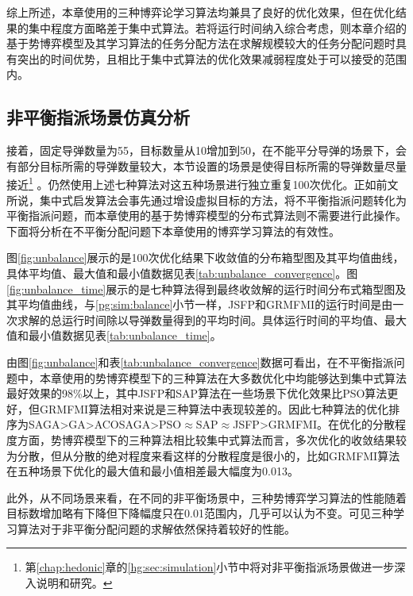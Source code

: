 综上所述，本章使用的三种博弈论学习算法均兼具了良好的优化效果，但在优化结果的集中程度方面略差于集中式算法。若将运行时间纳入综合考虑，则本章介绍的基于势博弈模型及其学习算法的任务分配方法在求解规模较大的任务分配问题时具有突出的时间优势，且相比于集中式算法的优化效果减弱程度处于可以接受的范围内。


\subsection{非平衡指派场景仿真分析}
\label{pg:sim:unbalance}
接着，固定导弹数量为55，目标数量从10增加到50，在不能平分导弹的场景下，会有部分目标所需的导弹数量较大，本节设置的场景是使得目标所需的导弹数量尽量接近\footnote{第\ref{chap:hedonic}章的\ref{hg:sec:simulation}小节中将对非平衡指派场景做进一步深入说明和研究。} 。仍然使用上述七种算法对这五种场景进行独立重复100次优化。正如前文所说，集中式启发算法会事先通过增设虚拟目标的方法，将不平衡指派问题转化为平衡指派问题，而本章使用的基于势博弈模型的分布式算法则不需要进行此操作。下面将分析在不平衡分配问题下本章使用的博弈学习算法的有效性。

图\ref{fig:unbalance}展示的是100次优化结果下收敛值的分布箱型图及其平均值曲线，具体平均值、最大值和最小值数据见表\ref{tab:unbalance_convergence}。图\ref{fig:unbalance_time}展示的是七种算法得到最终收敛解的运行时间分布式箱型图及其平均值曲线，与\ref{pg:sim:balance}小节一样，JSFP和GRMFMI的运行时间是由一次求解的总运行时间除以导弹数量得到的平均时间。具体运行时间的平均值、最大值和最小值数据见表\ref{tab:unbalance_time}。

由图\ref{fig:unbalance}和表\ref{tab:unbalance_convergence}数据可看出，在不平衡指派问题中，本章使用的势博弈模型下的三种算法在大多数优化中均能够达到集中式算法最好效果的98\%以上，其中JSFP和SAP算法在一些场景下优化效果比PSO算法更好，但GRMFMI算法相对来说是三种算法中表现较差的。因此七种算法的优化排序为SAGA>GA>ACOSAGA>PSO$\approx$SAP$\approx$JSFP>GRMFMI。在优化的分散程度方面，势博弈模型下的三种算法相比较集中式算法而言，多次优化的收敛结果较为分散，但从分散的绝对程度来看这样的分散程度是很小的，比如GRMFMI算法在五种场景下优化的最大值和最小值相差最大幅度为0.013。

此外，从不同场景来看，在不同的非平衡场景中，三种势博弈学习算法的性能随着目标数增加略有下降但下降幅度只在0.01范围内，几乎可以认为不变。可见三种学习算法对于非平衡分配问题的求解依然保持着较好的性能。

